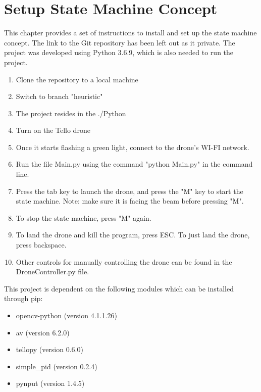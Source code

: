 \chapter{Setup State Machine Concept}
\label{app:setup}
This chapter provides a set of instructions to install and set up the state machine concept. The link to the Git repository has been left out as it private. The project was developed using Python 3.6.9, which is also needed to run the project.

\begin{enumerate}
	\itemsep0em
	\item Clone the repository to a local machine
	\item Switch to branch "heuristic"
	\item The project resides in the ./Python
	\item Turn on the Tello drone
	\item Once it starts flashing a green light, connect to the drone's WI-FI network.
	\item Run the file Main.py using the command "python Main.py" in the command line.
	\item Press the tab key to launch the drone, and press the "M" key to start the state machine. Note: make sure it is facing the beam before pressing "M".
	\item To stop the state machine, press "M" again.
	\item To land the drone and kill the program, press ESC. To just land the drone, press backspace.
	\item Other controls for manually controlling the drone can be found in the DroneController.py file.
\end{enumerate}

This project is dependent on the following modules which can be installed through pip:
\begin{itemize}
	\item opencv-python (version 4.1.1.26) 
	\item av (version 6.2.0)
	\item tellopy (version 0.6.0)
	\item simple\_pid (version 0.2.4)
	\item pynput (version 1.4.5)
\end{itemize}